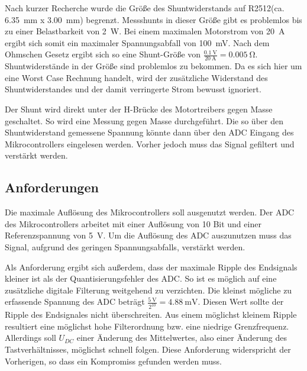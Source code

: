 Nach kurzer Recherche wurde die Größe des Shuntwiderstands auf R2512(ca. \SI{6,35}{\milli\meter} x \SI{3,00}{\milli\meter}) begrenzt. Messshunts in dieser Größe gibt es problemlos bis zu einer Belastbarkeit von \SI{2}{\watt}. 
Bei einem maximalen Motorstrom von \SI{20}{\ampere} ergibt sich somit ein maximaler Spannungsabfall von \SI{100}{\milli\volt}. Nach dem Ohmschen Gesetz ergibt sich so eine Shunt-Größe von
$\frac{\SI{0,1}{\volt}}{\SI{20}{\ampere}}=\SI{0,005}{\ohm}$. Shuntwiderstände in der Größe sind problemlos zu bekommen.
Da es sich hier um eine Worst Case Rechnung handelt, wird der zusätzliche Widerstand des Shuntwiderstandes und der damit verringerte Strom bewusst ignoriert.

Der Shunt wird direkt unter der H-Brücke des Motortreibers gegen Masse geschaltet. So wird eine Messung gegen Masse durchgeführt. Die so über den Shuntwiderstand gemessene Spannung könnte 
dann über den ADC Eingang des Mikrocontrollers eingelesen werden. Vorher jedoch muss das Signal gefiltert und verstärkt werden.

\subsection{Anforderungen}
Die maximale Auflösung des Mikrocontrollers soll ausgenutzt werden. Der ADC des Mikrocontrollers arbeitet mit einer Auflösung von 10 Bit und einer 
Referenzspannung von \SI{5}{\volt}. Um die Auflösung des ADC auszunutzen muss das Signal, aufgrund des geringen Spannungsabfalls, verstärkt werden.

Als Anforderung ergibt sich außerdem, dass der maximale Ripple des Endsignals kleiner ist als der Quantisierungsfehler des ADC.
So ist es möglich auf eine zusätzliche digitale Filterung weitgehend zu verzichten.
Die kleinst mögliche zu erfassende Spannung des ADC beträgt $\frac{\SI{5}{\volt}}{2^{10}}=\SI{4,88}{\milli\volt}$.
Diesen Wert sollte der Ripple des Endsignales nicht überschreiten.
Aus einem möglichst kleinem Ripple resultiert eine möglichst hohe Filterordnung bzw. eine niedrige Grenzfrequenz.
Allerdings soll $U_{DC}$ einer Änderung des Mittelwertes, also einer Änderung des Tastverhältnisses, möglichst
schnell folgen. Diese Anforderung widerspricht der Vorherigen, so dass ein Kompromiss gefunden werden muss.

